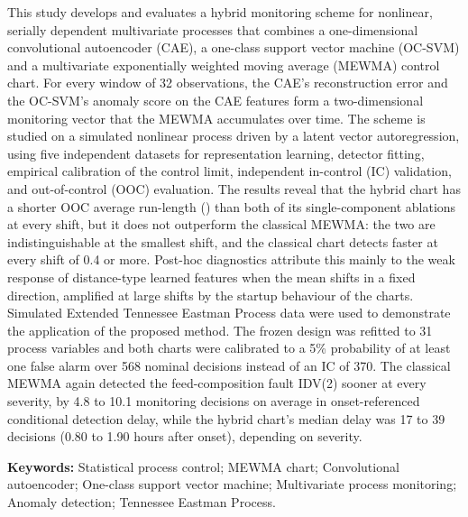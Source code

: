 This study develops and evaluates a hybrid monitoring scheme for nonlinear, serially dependent multivariate processes that combines a
one-dimensional convolutional autoencoder (CAE), a one-class support vector machine (OC-SVM) and
a multivariate exponentially weighted moving average (MEWMA) control chart. For every window of
32 observations, the CAE's reconstruction error and the OC-SVM's anomaly score on the CAE
features form a two-dimensional monitoring vector that the MEWMA accumulates over time. The
scheme is studied on a simulated nonlinear process driven by a latent vector autoregression,
using five independent datasets for representation learning, detector fitting, empirical
calibration of the control limit, independent in-control (IC) validation, and out-of-control (OOC)
evaluation. The results reveal that the hybrid chart has a shorter OOC average run-length (\ARL{}) than both of its single-component ablations at
every shift, but it does not outperform the classical MEWMA: the two are indistinguishable at the smallest
shift, and the classical chart detects faster at every shift of 0.4 or more. Post-hoc
diagnostics attribute this mainly to the weak response of distance-type learned features when the
mean shifts in a fixed direction, amplified at large shifts by the startup behaviour of the charts. Simulated
Extended Tennessee Eastman Process data were used to demonstrate the application of the proposed
method. The frozen design was refitted to 31 process variables and both charts were
calibrated to a 5\% probability of at least one false alarm over 568 nominal decisions instead of an IC \ARL{} of 370. The classical MEWMA again detected the feed-composition fault IDV(2) sooner at every severity, by 4.8 to
10.1 monitoring decisions on average in onset-referenced conditional detection delay, while the
hybrid chart's median delay was 17 to 39 decisions (0.80 to 1.90 hours after onset), depending on
severity.

\noindent\textbf{Keywords:} Statistical process control; MEWMA chart; Convolutional autoencoder;
One-class support vector machine; Multivariate process monitoring; Anomaly detection;
Tennessee Eastman Process.